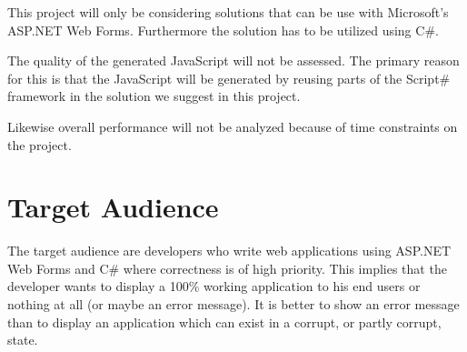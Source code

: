 		This project will only be considering solutions that can be use with Microsoft’s ASP.NET Web Forms. Furthermore the solution has to be utilized using C\#.

		The quality of the generated JavaScript will not be assessed. The primary reason for this is that the JavaScript will be generated by reusing parts of the Script\# framework in the solution we suggest in this project.

		Likewise overall performance will not be analyzed because of time constraints on the project.


\section{Target Audience}
	The target audience are developers who write web applications using ASP.NET Web Forms and C\# where correctness is of high priority. This implies that the developer wants to display a 100\% working application to his end users or nothing at all (or maybe an error message). It is better to show an error message than to display an application which can exist in a corrupt, or partly corrupt, state.





